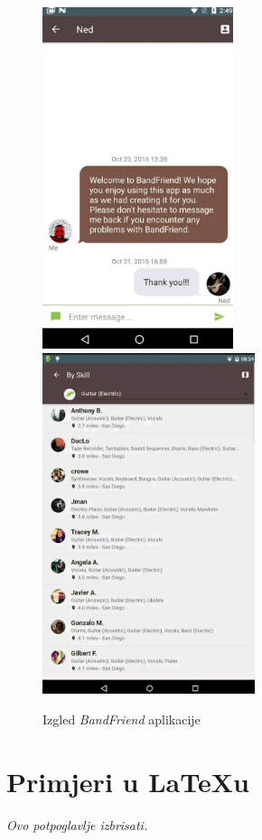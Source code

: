 		\begin{figure}[H]
			\begin{center}
				\includegraphics[height=10cm]{slike/BandFriend.JPEG}
				\includegraphics[height=10cm]{slike/BandFriend2.JPEG}
			\end{center}
			\caption{Izgled \textit{BandFriend} aplikacije}
			\label{fig:promjene2}
		\end{figure}
		
		\section{Primjeri u LaTeXu}
		
		\textit{Ovo potpoglavlje izbrisati.}\\

